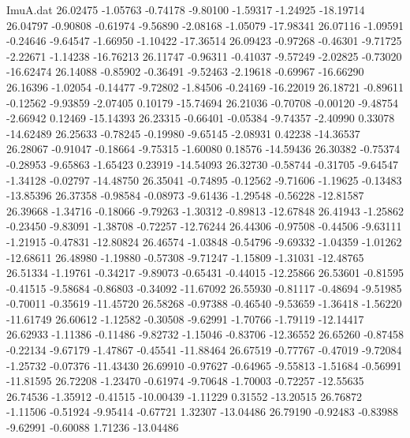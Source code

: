 \begin{filecontents}{ImuA.dat}
  26.02475   -1.05763   -0.74178   -9.80100   -1.59317   -1.24925  -18.19714
  26.04797   -0.90808   -0.61974   -9.56890   -2.08168   -1.05079  -17.98341
  26.07116   -1.09591   -0.24646   -9.64547   -1.66950   -1.10422  -17.36514
  26.09423   -0.97268   -0.46301   -9.71725   -2.22671   -1.14238  -16.76213
  26.11747   -0.96311   -0.41037   -9.57249   -2.02825   -0.73020  -16.62474
  26.14088   -0.85902   -0.36491   -9.52463   -2.19618   -0.69967  -16.66290
  26.16396   -1.02054   -0.14477   -9.72802   -1.84506   -0.24169  -16.22019
  26.18721   -0.89611   -0.12562   -9.93859   -2.07405    0.10179  -15.74694
  26.21036   -0.70708   -0.00120   -9.48754   -2.66942    0.12469  -15.14393
  26.23315   -0.66401   -0.05384   -9.74357   -2.40990    0.33078  -14.62489
  26.25633   -0.78245   -0.19980   -9.65145   -2.08931    0.42238  -14.36537
  26.28067   -0.91047   -0.18664   -9.75315   -1.60080    0.18576  -14.59436
  26.30382   -0.75374   -0.28953   -9.65863   -1.65423    0.23919  -14.54093
  26.32730   -0.58744   -0.31705   -9.64547   -1.34128   -0.02797  -14.48750
  26.35041   -0.74895   -0.12562   -9.71606   -1.19625   -0.13483  -13.85396
  26.37358   -0.98584   -0.08973   -9.61436   -1.29548   -0.56228  -12.81587
  26.39668   -1.34716   -0.18066   -9.79263   -1.30312   -0.89813  -12.67848
  26.41943   -1.25862   -0.23450   -9.83091   -1.38708   -0.72257  -12.76244
  26.44306   -0.97508   -0.44506   -9.63111   -1.21915   -0.47831  -12.80824
  26.46574   -1.03848   -0.54796   -9.69332   -1.04359   -1.01262  -12.68611
  26.48980   -1.19880   -0.57308   -9.71247   -1.15809   -1.31031  -12.48765
  26.51334   -1.19761   -0.34217   -9.89073   -0.65431   -0.44015  -12.25866
  26.53601   -0.81595   -0.41515   -9.58684   -0.86803   -0.34092  -11.67092
  26.55930   -0.81117   -0.48694   -9.51985   -0.70011   -0.35619  -11.45720
  26.58268   -0.97388   -0.46540   -9.53659   -1.36418   -1.56220  -11.61749
  26.60612   -1.12582   -0.30508   -9.62991   -1.70766   -1.79119  -12.14417
  26.62933   -1.11386   -0.11486   -9.82732   -1.15046   -0.83706  -12.36552
  26.65260   -0.87458   -0.22134   -9.67179   -1.47867   -0.45541  -11.88464
  26.67519   -0.77767   -0.47019   -9.72084   -1.25732   -0.07376  -11.43430
  26.69910   -0.97627   -0.64965   -9.55813   -1.51684   -0.56991  -11.81595
  26.72208   -1.23470   -0.61974   -9.70648   -1.70003   -0.72257  -12.55635
  26.74536   -1.35912   -0.41515  -10.00439   -1.11229    0.31552  -13.20515
  26.76872   -1.11506   -0.51924   -9.95414   -0.67721    1.32307  -13.04486
  26.79190   -0.92483   -0.83988   -9.62991   -0.60088    1.71236  -13.04486

\end{filecontents}
